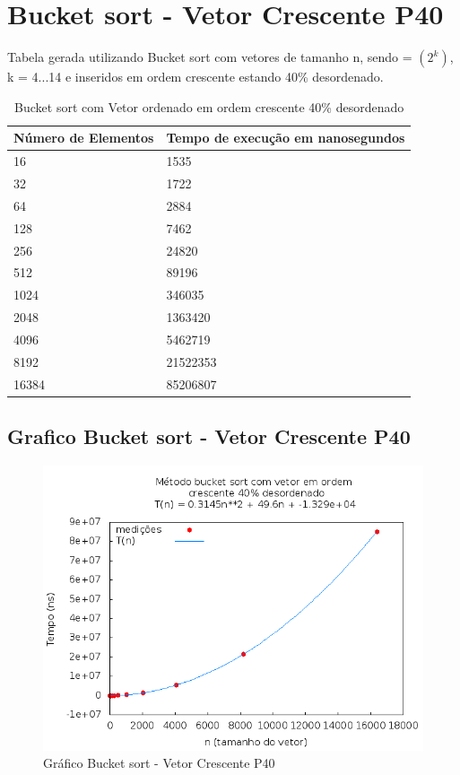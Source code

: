 \documentclass[12pt,a4paper,twoside]{report}
\begin{document}
\section{Bucket sort - Vetor Crescente P40}
Tabela gerada utilizando Bucket sort com vetores de tamanho n, sendo = $(2^k)$, k = 4...14 e inseridos em ordem crescente estando 40\% desordenado.

\begin{table}[H]
\centering
\caption{Bucket sort com Vetor ordenado em ordem crescente 40\% desordenado}
\label{my-label}
\begin{tabular}{|l|l|}
\hline
\multicolumn{1}{|c|}{\textbf{Número de Elementos}} & \multicolumn{1}{c|}{\textbf{Tempo de execução em nanosegundos}} \\ \hline
16 & 1535 \\ \hline
32 & 1722 \\ \hline
64 & 2884 \\ \hline
128 & 7462 \\ \hline
256 & 24820 \\ \hline
512 & 89196 \\ \hline
1024 & 346035 \\ \hline
2048 & 1363420 \\ \hline
4096 & 5462719 \\ \hline
8192 & 21522353 \\ \hline
16384 & 85206807 \\ \hline
\end{tabular}
\end{table}

\subsection{Grafico Bucket sort - Vetor Crescente P40}
\begin{figure}[H]
    \centering
    \includegraphics[width=0.7\linewidth]{graficos/Bucket/vIntCrescenteP40/vIntCrescenteP40.png}
  \caption{Gráfico Bucket sort - Vetor Crescente P40}
\end{figure}
\end{document}
